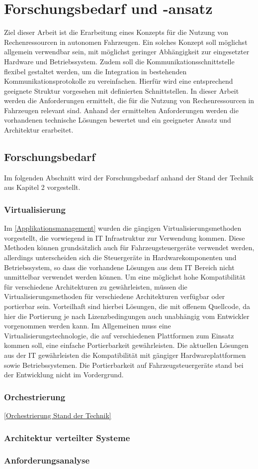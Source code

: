 \chapter{Forschungsbedarf und -ansatz}

Ziel dieser Arbeit ist die Erarbeitung eines Konzepts für die Nutzung von Rechenressourcen in autonomen Fahrzeugen. Ein solches Konzept soll möglichst allgemein verwendbar sein, mit möglichst geringer Abhängigkeit zur eingesetzter Hardware und Betriebssystem. Zudem soll die Kommunikationsschnittstelle flexibel gestaltet werden, um die Integration in bestehenden Kommunikationsprotokolle zu vereinfachen. Hierfür wird eine entsprechend geeignete Struktur vorgesehen mit definierten Schnittstellen. In dieser Arbeit werden die Anforderungen ermittelt, die für die Nutzung von Rechenressourcen in Fahrzeugen relevant sind. Anhand der ermittelten Anforderungen werden die vorhandenen technische Lösungen bewertet und ein geeigneter Ansatz und Architektur erarbeitet.



\section{Forschungsbedarf}

Im folgenden Abschnitt wird der Forschungsbedarf anhand der Stand der Technik aus Kapitel 2 vorgestellt. 

\subsection{Virtualisierung}
Im \autoref{Applikationsmanagement} wurden die gängigen Virtualisierungsmethoden vorgestellt, die vorwiegend in IT Infrastruktur zur Verwendung kommen. Diese Methoden können grundsätzlich auch für Fahrzeugsteuergeräte verwendet werden, allerdings unterscheiden sich die Steuergeräte in Hardwarekomponenten und Betriebssystem, so dass die vorhandene Lösungen aus dem IT Bereich nicht unmittelbar verwendet werden können. Um eine möglichst hohe Kompatibilität für verschiedene Architekturen zu gewährleisten, müssen die Virtualisierungsmethoden für verschiedene Architekturen verfügbar oder portierbar sein. Vorteilhaft sind hierbei Lösungen, die mit offenem Quellcode, da hier die Portierung je nach Lizenzbedingungen auch unabhängig vom Entwickler vorgenommen werden kann. Im Allgemeinen muss eine Virtualisierungstechnologie, die auf verschiedenen Plattformen zum Einsatz kommen soll, eine einfache Portierbarkeit gewährleisten. Die aktuellen Lösungen aus der IT gewährleisten die Kompatibilität mit gängiger Hardwareplattformen sowie Betriebssystemen. Die Portierbarkeit auf Fahrzeugsteuergeräte stand bei der Entwicklung nicht im Vordergrund.
\subsection{Orchestrierung}
\autoref{Orchestrierung Stand der Technik}

\subsection{Architektur verteilter Systeme}

\subsection{Anforderungsanalyse}


